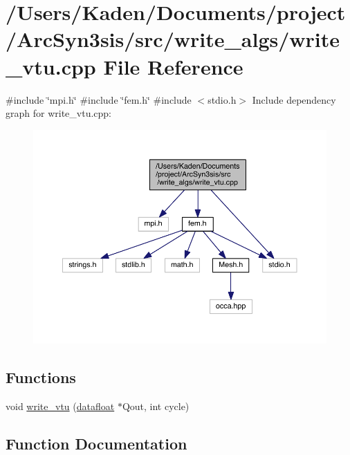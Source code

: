 \hypertarget{a01017}{}\section{/\+Users/\+Kaden/\+Documents/project/\+Arc\+Syn3sis/src/write\+\_\+algs/write\+\_\+vtu.cpp File Reference}
\label{a01017}
{\ttfamily \#include \char`\"{}mpi.\+h\char`\"{}}\newline
{\ttfamily \#include \char`\"{}fem.\+h\char`\"{}}\newline
{\ttfamily \#include $<$stdio.\+h$>$}\newline
Include dependency graph for write\+\_\+vtu.\+cpp\+:\nopagebreak
\begin{figure}[H]
\begin{center}
\leavevmode
\includegraphics[width=350pt]{a01018}
\end{center}
\end{figure}
\subsection*{Functions}
\begin{DoxyCompactItemize}
\item 
void \hyperlink{a01017_a15eb4ac652a19c210d2bc59268d6a474}{write\+\_\+vtu} (\hyperlink{a00557_aa484d27c864c1a224505d8a302c0a4a4}{datafloat} $\ast$Qout, int cycle)
\end{DoxyCompactItemize}


\subsection{Function Documentation}
\mbox{\label{a01017_a15eb4ac652a19c210d2bc59268d6a474}} 
